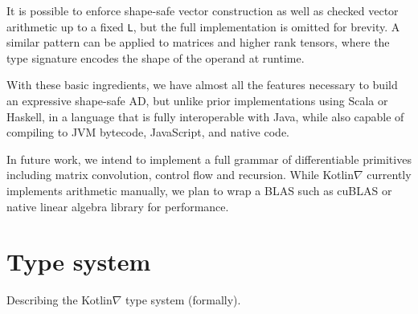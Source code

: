 \documentclass[12pt,initial,twoside,maitrise]{dms}
\numberwithin{equation}{section}
\numberwithin{table}{chapter}
\numberwithin{figure}{chapter}
\begin{document}
It is possible to enforce shape-safe vector construction as well as checked vector arithmetic up to a fixed \texttt{L}, but the full implementation is omitted for brevity. A similar pattern can be applied to matrices and higher rank tensors, where the type signature encodes the shape of the operand at runtime.

With these basic ingredients, we have almost all the features necessary to build an expressive shape-safe AD, but unlike prior implementations using Scala or Haskell, in a language that is fully interoperable with Java, while also capable of compiling to JVM bytecode, JavaScript, and native code.

In future work, we intend to implement a full grammar of differentiable primitives including matrix convolution, control flow and recursion. While Kotlin$\nabla$ currently implements arithmetic manually, we plan to wrap a BLAS such as cuBLAS or native linear algebra library for performance.

\section{Type system}

Describing the Kotlin$\nabla$ type system (formally).
\end{document}
